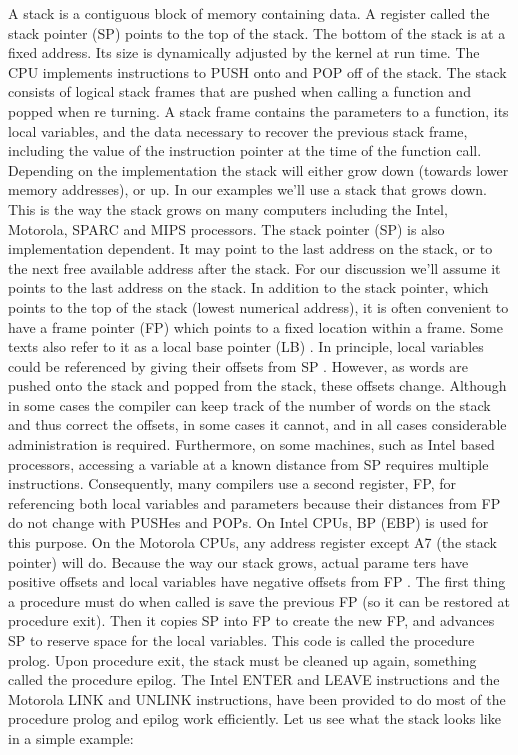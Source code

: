 \documentclass[10pt]{article}
\begin{document}
A stack is a contiguous block of memory containing data. A register called the stack pointer (SP) points to the 
top of the stack. The bottom of the stack is at a fixed address. Its size is dynamically adjusted by the kernel at 
run time. The CPU implements instructions to PUSH onto and POP off of the stack. The stack consists of 
logical stack frames  that are pushed when calling a function and popped when re turning. A stack frame 
contains the parameters to a function, its local variables, and the data necessary to recover the previous stack frame,
including the value of the instruction pointer at the time of the function call. Depending on the 
implementation the stack will either grow down (towards lower memory addresses), or up. In our examples 
we'll use a stack that grows down. This is the way the stack grows on many computers including the Intel, 
Motorola, SPARC and MIPS processors. The  stack pointer (SP) is also implementation dependent.  It may point 
to the last address on the stack, or to the next free available address after the stack. For our discussion we'll 
assume it points to the last address on the stack. In addition to the stack pointer, which points to the top of the 
stack (lowest numerical address), it is often convenient to have a frame pointer (FP) which points to a fixed 
location within a frame. Some texts also refer to it as a local base pointer (LB) . In principle, local variables 
could be referenced by giving their offsets from SP . However, as words are pushed onto the stack and popped 
from the stack, these offsets change. Although in some cases the compiler can keep track of the number of 
words on the stack and thus correct the offsets, in some cases it cannot, and in all cases  considerable 
administration is required. Furthermore, on some machines, such as Intel based processors, accessing a variable 
at a known distance from SP requires multiple instructions. Consequently, many compilers use a second 
register, FP, for referencing both local variables and parameters because their distances from FP do not change 
with PUSHes and POPs. On Intel CPUs, BP (EBP) is used for this purpose. On the Motorola CPUs, any 
address register except A7 (the stack pointer) will do. Because the way our stack grows, actual parame ters have 
positive offsets and local variables have negative offsets from FP . The first thing a procedure must do when 
called is save the previous FP (so it can be restored at procedure exit). Then it copies SP into FP to create the 
new FP, and advances SP to reserve space for the local variables. This code is called  the procedure prolog. 
Upon procedure exit, the stack must be cleaned up again, something called  the procedure epilog. The Intel  
ENTER and LEAVE instructions and the Motorola LINK and UNLINK  instructions, have been provided to do 
most of the procedure prolog and epilog work efficiently. Let us see what the stack looks like in a simple 
example:
\end{document}
